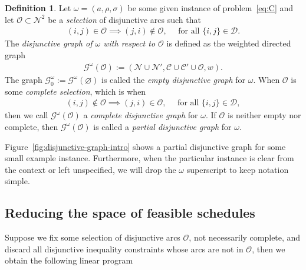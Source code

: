 \documentclass[a4paper]{report}
\theoremstyle{definition}
\newtheorem{define}{Definition}[chapter]
\theoremstyle{plain}
\begin{document}
\begin{define}
  Let $\omega=(a, \rho, \sigma)$ be some given instance of
  problem~\eqref{eq:C} and let $\mathcal{O} \subset \mathcal{N}^2$ be a
  \emph{selection} of disjunctive arcs such that
  \begin{align}\tag{dg.1}
    (i,j) \in \mathcal{O} \implies (j, i) \notin \mathcal{O} , \quad \text{ for all } \{i,j\} \in \mathcal{D} .
  \end{align}
  The \emph{disjunctive graph of $\omega$ with respect to $\mathcal{O}$} is defined
  as the weighted directed graph
  \begin{align}\tag{dg.2}
    \mathcal{G}^\omega(\mathcal{O}) := (\mathcal{N} \cup \mathcal{N}', \mathcal{C} \cup \mathcal{C}' \cup \mathcal{O}, w) .
  \end{align}
  The graph $\mathcal{G}_0^\omega := \mathcal{G}^\omega(\varnothing)$ is called the
  \emph{empty disjunctive graph} for $\omega$.
  When $\mathcal{O}$ is some \emph{complete selection}, which is when
  \begin{align}\tag{dg.3}
    (i,j) \notin \mathcal{O} \implies (j, i) \in \mathcal{O},  \quad \text{ for all } \{i,j\} \in \mathcal{D} ,
  \end{align}
  then we call $\mathcal{G}^\omega(\mathcal{O})$ a \emph{complete disjunctive graph}
  for $\omega$.
  If $\mathcal{O}$ is neither empty nor complete, then
  $\mathcal{G}^\omega(\mathcal{O})$ is called a \emph{partial disjunctive graph} for
  $\omega$.
\end{define}

Figure~\ref{fig:disjunctive-graph-intro} shows a partial disjunctive graph for
some small example instance. Furthermore, when the particular instance is clear
from the context or left unspecified, we will drop the $\omega$ superscript to keep
notation simple.


\subsection{Reducing the space of feasible schedules}

Suppose we fix some selection of disjunctive arcs $\mathcal{O}$, not
necessarily complete, and discard all disjunctive inequality constraints whose
arcs are not in $\mathcal{O}$, then we obtain the following linear program
\end{document}
